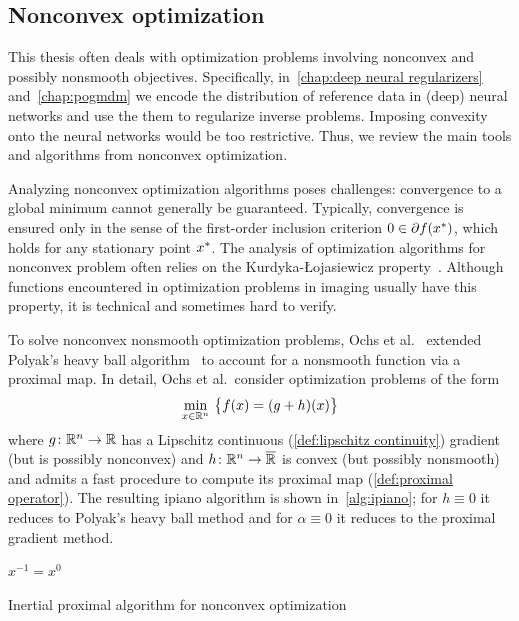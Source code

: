 \subsection{Nonconvex optimization}
\label{ssec:nonconvex optimization}
This thesis often deals with optimization problems involving nonconvex and possibly nonsmooth objectives.
Specifically, in~\cref{chap:deep neural regularizers} and~\cref{chap:pogmdm} we encode the distribution of reference data in (deep) neural networks and use the them to regularize inverse problems.
Imposing convexity onto the neural networks would be too restrictive.
Thus, we review the main tools and algorithms from nonconvex optimization.

Analyzing nonconvex optimization algorithms poses challenges:
convergence to a global minimum cannot generally be guaranteed.
Typically, convergence is ensured only in the sense of the first-order inclusion criterion \( \num{0} \in \partial f({x}^\ast) \), which holds for any stationary point \( {x}^\ast \).
The analysis of optimization algorithms for nonconvex problem often relies on the Kurdyka-Łojasiewicz property~\cite[section 3.2]{attouch_proximalKL_2010}.
Although functions encountered in optimization problems in imaging usually have this property, it is technical and sometimes hard to verify.

To solve nonconvex nonsmooth optimization problems, Ochs et al.~\cite{ochs_ipiano_2014} extended Polyak's heavy ball algorithm~\cite{POLYAK19641} to account for a nonsmooth function via a proximal map.
In detail, Ochs et al.\ consider optimization problems of the form
\begin{equation}
	\min_{x\in \R^n}\ \bigl\{ f(x) = (g + h)(x) \bigr\}%
	\label{eq:nonconvex smooth plus nonsmooth}
\end{equation}
where \( g \colon \mathbb{R}^n \to \mathbb{R} \) has a Lipschitz continuous (\cref{def:lipschitz continuity}) gradient (but is possibly nonconvex) and \( h \colon \mathbb{R}^n \to \overline{\mathbb{R}} \) is convex (but possibly nonsmooth) and admits a fast procedure to compute its proximal map (\cref{def:proximal operator}).
The resulting \gls{ipiano} algorithm is shown in~\cref{alg:ipiano}; for \( h \equiv \num{0} \) it reduces to Polyak's heavy ball method and for \( \alpha \equiv \num{0} \) it reduces to the proximal gradient method.
\begin{algorithm}
	\DontPrintSemicolon
	\( x^{\num{-1}} = x^{\num{0}} \)\;
	\caption{Inertial proximal algorithm for nonconvex optimization~\cite{ochs_ipiano_2014}}
	\label{alg:ipiano}
\end{algorithm}

